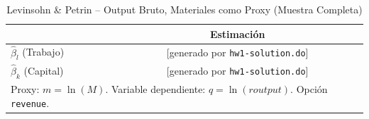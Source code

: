 \begin{table}[H]
\centering
\caption{Levinsohn \& Petrin -- Output Bruto, Materiales como Proxy (Muestra Completa)}
\begin{tabular}{lc}
\toprule
 & Estimación \\
\midrule
$\hat{\beta}_l$ (Trabajo) & [generado por \texttt{hw1-solution.do}] \\
$\hat{\beta}_k$ (Capital) & [generado por \texttt{hw1-solution.do}] \\
\bottomrule
\multicolumn{2}{l}{\small Proxy: $m = \ln(M)$. Variable dependiente: $q = \ln(\mathit{routput})$. Opción \texttt{revenue}.}
\end{tabular}
\end{table}
